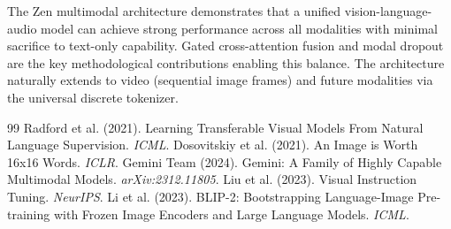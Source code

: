 \documentclass[11pt,a4paper]{article}
\begin{document}
The Zen multimodal architecture demonstrates that a unified vision-language-audio
model can achieve strong performance across all modalities with minimal sacrifice
to text-only capability. Gated cross-attention fusion and modal dropout are the
key methodological contributions enabling this balance. The architecture naturally
extends to video (sequential image frames) and future modalities via the universal
discrete tokenizer.


\begin{thebibliography}{99}
 Radford et al. (2021). Learning Transferable Visual Models From Natural Language Supervision. \textit{ICML}.
 Dosovitskiy et al. (2021). An Image is Worth 16x16 Words. \textit{ICLR}.
 Gemini Team (2024). Gemini: A Family of Highly Capable Multimodal Models. \textit{arXiv:2312.11805}.
 Liu et al. (2023). Visual Instruction Tuning. \textit{NeurIPS}.
 Li et al. (2023). BLIP-2: Bootstrapping Language-Image Pre-training with Frozen Image Encoders and Large Language Models. \textit{ICML}.
\end{thebibliography}
\end{document}
